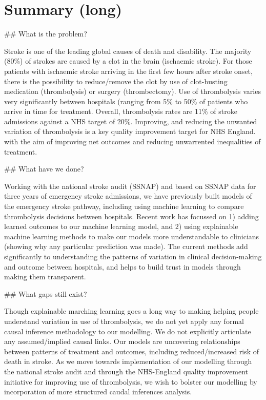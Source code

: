 \section{Summary (long)}
\begin{markdown}

## What is the problem?

Stroke is one of the leading global causes of death and disability. The majority (80\%) of strokes are caused by a clot in the brain (ischaemic stroke). For those patients with ischaemic stroke arriving in the first few hours after stroke onset, there is the possibility to reduce/remove the clot by use of clot-busting medication (thrombolysis) or surgery (thrombectomy). Use of thrombolysis varies very significantly between hospitals (ranging from 5\% to 50\% of patients who arrive in time for treatment. Overall, thrombolysis rates are 11\% of stroke admissions against a NHS target of 20\%. Improving, and reducing the unwanted variation of thrombolysis is a key quality improvement target for NHS England. with the aim of improving net outcomes and reducing unwarrented inequalities of treatment.

## What have we done?

Working with the national stroke audit (SSNAP) and based on SSNAP data for three years of emergency stroke admissions, we have previously built models of the emergency stroke pathway, including using machine learning to compare thrombolysis decisions between hospitals. Recent work has focussed on 1) adding learned outcomes to our machine learning model, and 2) using explainable machine learning methods to make our models more understandable to clinicians (showing why any particular prediction was made). The current methods add significantly to understanding the patterns of variation in clinical decision-making and outcome between hospitals, and helps to build trust in models through making them transparent.

## What gaps still exist?

Though explainable marching learning goes a long way to making helping people understand variation in use of thrombolysis, we do not yet apply any formal causal inference methodology to our modelling. We do not explicitly articulate any assumed/implied causal links. Our models are uncovering relationships between patterns of treatment and outcomes, including reduced/increased risk of death in stroke. As we move towards implementation of our modelling through the national stroke audit and through the NHS-England quality improvement initiative for improving use of thrombolysis, we wish to bolster our modelling by incorporation of more structured caudal inferences analysis.


\end{markdown}
